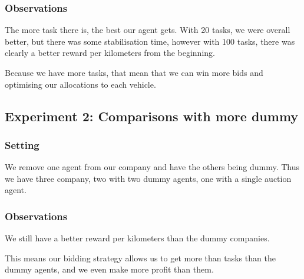 \documentclass[11pt]{article}
\begin{document}
\subsubsection{Observations}
The more task there is, the best our agent gets. With 20 tasks, we were overall
better, but there was some stabilisation time, however with 100 tasks, there was
clearly a better reward per kilometers from the beginning.

Because we have more tasks, that mean that we can win more bids and optimising
our allocations to each vehicle.

\subsection{Experiment 2: Comparisons with more dummy}

\subsubsection{Setting}

We remove one agent from our company and have the others being dummy. Thus we
have three company, two with two dummy agents, one with a single auction agent.

\subsubsection{Observations}

We still have a better reward per kilometers than the dummy companies.

This means our bidding strategy allows us to get more than tasks than the dummy
agents, and we even make more profit than them.
\end{document}
